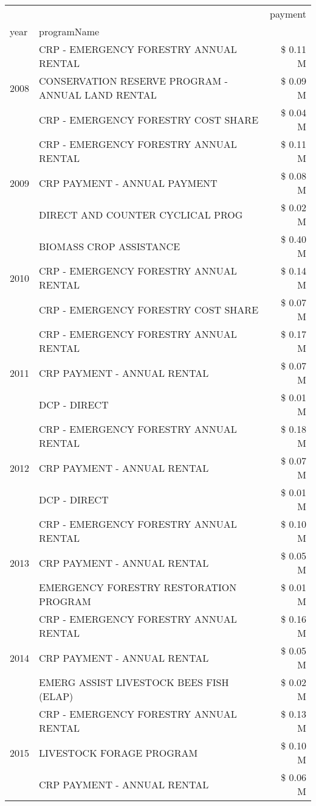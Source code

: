 \begin{tabular}{llr}
\toprule
 &  & payment \\
year & programName &  \\
\midrule
\multirow[t]{3}{*}{2008} & CRP - EMERGENCY FORESTRY ANNUAL RENTAL & \$ 0.11 M \\
 & CONSERVATION RESERVE PROGRAM - ANNUAL LAND RENTAL & \$ 0.09 M \\
 & CRP - EMERGENCY FORESTRY COST SHARE & \$ 0.04 M \\
\cline{1-3}
\multirow[t]{3}{*}{2009} & CRP - EMERGENCY FORESTRY ANNUAL RENTAL & \$ 0.11 M \\
 & CRP PAYMENT - ANNUAL PAYMENT & \$ 0.08 M \\
 & DIRECT AND COUNTER CYCLICAL PROG & \$ 0.02 M \\
\cline{1-3}
\multirow[t]{3}{*}{2010} & BIOMASS CROP ASSISTANCE & \$ 0.40 M \\
 & CRP - EMERGENCY FORESTRY ANNUAL RENTAL & \$ 0.14 M \\
 & CRP - EMERGENCY FORESTRY COST SHARE & \$ 0.07 M \\
\cline{1-3}
\multirow[t]{3}{*}{2011} & CRP - EMERGENCY FORESTRY ANNUAL RENTAL & \$ 0.17 M \\
 & CRP PAYMENT - ANNUAL RENTAL & \$ 0.07 M \\
 & DCP - DIRECT & \$ 0.01 M \\
\cline{1-3}
\multirow[t]{3}{*}{2012} & CRP - EMERGENCY FORESTRY ANNUAL RENTAL & \$ 0.18 M \\
 & CRP PAYMENT - ANNUAL RENTAL & \$ 0.07 M \\
 & DCP - DIRECT & \$ 0.01 M \\
\cline{1-3}
\multirow[t]{3}{*}{2013} & CRP - EMERGENCY FORESTRY ANNUAL RENTAL & \$ 0.10 M \\
 & CRP PAYMENT - ANNUAL RENTAL & \$ 0.05 M \\
 & EMERGENCY FORESTRY RESTORATION PROGRAM & \$ 0.01 M \\
\cline{1-3}
\multirow[t]{3}{*}{2014} & CRP - EMERGENCY FORESTRY ANNUAL RENTAL & \$ 0.16 M \\
 & CRP PAYMENT - ANNUAL RENTAL & \$ 0.05 M \\
 & EMERG ASSIST LIVESTOCK BEES FISH (ELAP) & \$ 0.02 M \\
\cline{1-3}
\multirow[t]{3}{*}{2015} & CRP - EMERGENCY FORESTRY ANNUAL RENTAL & \$ 0.13 M \\
 & LIVESTOCK FORAGE PROGRAM & \$ 0.10 M \\
 & CRP PAYMENT - ANNUAL RENTAL & \$ 0.06 M \\

\end{tabular}
